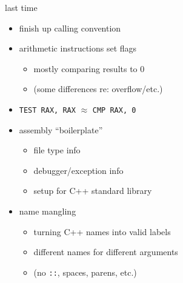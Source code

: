 \begin{comment}
\begin{frame}{last time}
    \begin{itemize}
    \item specifying memory locations
        \begin{itemize}
            \item \texttt{DWORD PTR [RAX+4*RBX+17]}
        \end{itemize}
    \item multiply/divide
    \item LEA
    \item calling convention: rules so we can call functions consistently
        \begin{itemize}
            \item where arguments, return value are
            \item who needs to save/restore register values
        \end{itemize}
    \end{itemize}
\end{frame}
\end{comment}

\begin{frame}{last time}
    \begin{itemize}
    \item finish up calling convention
    \item arithmetic instructions set flags
        \begin{itemize}
        \item mostly comparing results to 0
        \item (some differences re: overflow/etc.)
        \end{itemize}
    \item \texttt{TEST RAX, RAX} $\approx$ \texttt{CMP RAX, 0}
    \item assembly ``boilerplate''
        \begin{itemize}
        \item file type info
        \item debugger/exception info
        \item setup for C++ standard library
        \end{itemize}
    \item name mangling
        \begin{itemize}
        \item turning C++ names into valid labels
        \item different names for different arguments
        \item (no \texttt{::}, spaces, parens, etc.)
        \end{itemize}
    \end{itemize}
\end{frame}

